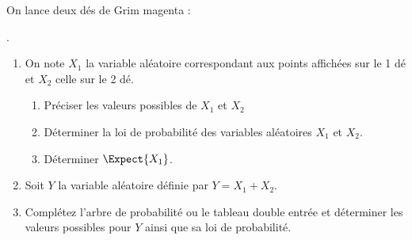 \documentclass[main.tex]{subfiles}
\begin{document}
\begin{exercise} On lance deux dés  de Grim magenta   :  .
\begin{enumerate}[leftmargin=*,label=\arabic*)]
\item On note $X_1$ la variable aléatoire correspondant aux points affichées sur le   1 dé et  $X_2$ celle sur le 2  dé.
\begin{enumerate}[leftmargin=*,label=\alph*)]
	\item Préciser les valeurs possibles de $X_1$ et $X_2$
	\item Déterminer la loi de probabilité des variables aléatoires $X_1$ et $X_2$.
	\item Déterminer $\Expect{X_1}$.
\end{enumerate}
\item Soit $Y$ la variable aléatoire définie par $Y=X_1+X_2$.
\item Complétez l'arbre de probabilité ou le tableau double entrée et déterminer les valeurs possibles pour $Y$ ainsi que sa loi de probabilité.


\end{enumerate}
\end{exercise}
\end{document}
